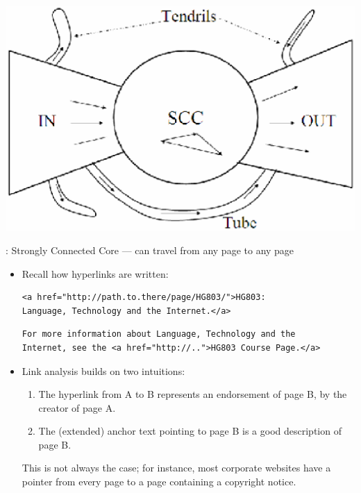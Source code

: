 \documentclass[a4paper,landscape,headrule,footrule,xetex]{foils}
\begin{document}
\begin{center}
\includegraphics[height=0.8\textheight]{../pics/web-bowtie-bw.eps}  
\end{center}
: Strongly Connected Core --- can travel from any page to any page



\begin{itemize}
\item Recall how hyperlinks are written: \vspace{-1ex}
\begin{verbatim}
<a href="http://path.to.there/page/HG803/">HG803: 
Language, Technology and the Internet.</a>
\end{verbatim}
\begin{verbatim}
For more information about Language, Technology and the
Internet, see the <a href="http://..">HG803 Course Page.</a>
\end{verbatim}
\item Link analysis builds on two intuitions:
  \begin{enumerate}
  \item The hyperlink from A to B represents an endorsement of page B, by the creator of page A.

  \item The (extended) anchor text pointing to page B is a good description of page B.
  \end{enumerate}
  \small {This is not always the case; for instance, most corporate websites have a pointer from every page to a page containing a copyright notice.}
\end{itemize}

\end{document}
